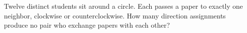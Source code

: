 Twelve distinct students sit around a circle. Each passes a paper to exactly one neighbor, clockwise or counterclockwise. How many direction assignments produce no pair who exchange papers with each other?
